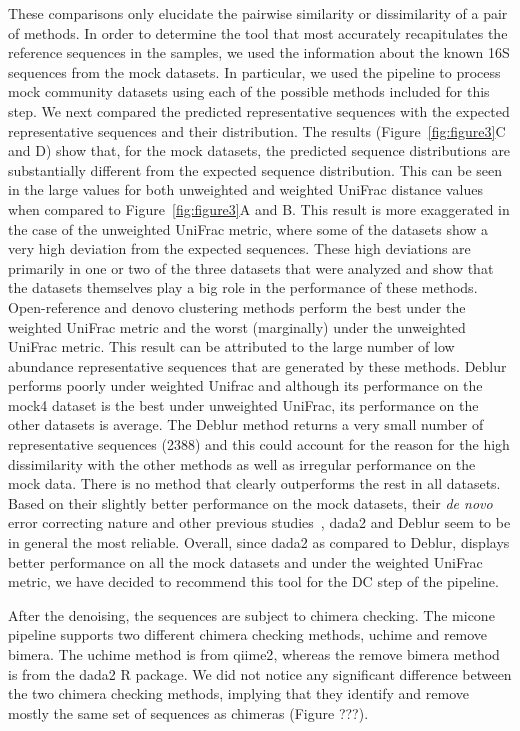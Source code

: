   These comparisons only elucidate the pairwise similarity or dissimilarity of a pair of methods.
  In order to determine the tool that most accurately recapitulates the reference sequences in the samples, we used the information about the known 16S sequences from the mock datasets.
  In particular, we used the pipeline to process mock community datasets using each of the possible methods included for this step.
  We next compared the predicted representative sequences with the expected representative sequences and their distribution.
  The results (Figure~\ref{fig:figure3}C and D) show that, for the mock datasets, the predicted sequence distributions are substantially different from the expected sequence distribution.
  This can be seen in the large values for both unweighted and weighted UniFrac distance values when compared to Figure~\ref{fig:figure3}A and B.
  This result is more exaggerated in the case of the unweighted UniFrac metric, where some of the datasets show a very high deviation from the expected sequences.
  These high deviations are primarily in one or two of the three datasets that were analyzed and show that the datasets themselves play a big role in the performance of these methods.
  Open-reference and denovo clustering methods perform the best under the weighted UniFrac metric and the worst (marginally) under the unweighted UniFrac metric.
  This result can be attributed to the large number of low abundance representative sequences that are generated by these methods.
  Deblur performs poorly under weighted Unifrac and although its performance on the mock4 dataset is the best under unweighted UniFrac, its performance on the other datasets is average.
  The Deblur method returns a very small number of representative sequences (2388) and this could account for the reason for the high dissimilarity with the other methods as well as irregular performance on the mock data.
  There is no method that clearly outperforms the rest in all datasets.
  Based on their slightly better performance on the mock datasets, their \textit{de novo} error correcting nature and other previous studies~\cite{Nearing2018}, \ac{dada2} and Deblur seem to be in general the most reliable.
  Overall, since \ac{dada2} as compared to Deblur, displays better performance on all the mock datasets and under the weighted UniFrac metric, we have decided to recommend this tool for the DC step of the pipeline.

  After the denoising, the sequences are subject to chimera checking.
  The \ac{micone} pipeline supports two different chimera checking methods, uchime and remove bimera.
  The uchime method is from \ac{qiime2}, whereas the remove bimera method is from the \ac{dada2} R package.
  We did not notice any significant difference between the two chimera checking methods, implying that they identify and remove mostly the same set of sequences as chimeras (Figure ???).

